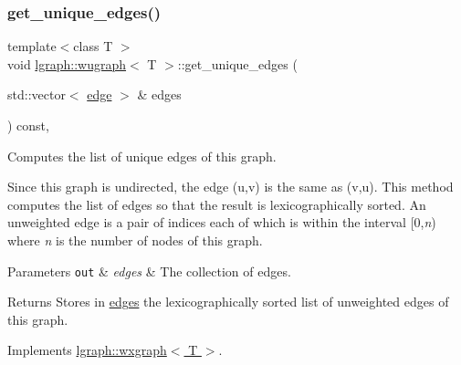 \subsubsection{\texorpdfstring{get\+\_\+unique\+\_\+edges()}{get\_unique\_edges()}\hspace{0.1cm}{\footnotesize\ttfamily [2/2]}}
{\footnotesize\ttfamily template$<$class T $>$ \\
void \hyperlink{classlgraph_1_1wugraph}{lgraph\+::wugraph}$<$ T $>$\+::get\+\_\+unique\+\_\+edges (\begin{DoxyParamCaption}\item[{std\+::vector$<$ \hyperlink{namespacelgraph_a76bd7d50719f03de7a85db259d80d572}{edge} $>$ \&}]{edges }\end{DoxyParamCaption}) const\hspace{0.3cm}{\ttfamily [protected]}, {\ttfamily [virtual]}}



Computes the list of unique edges of this graph. 

Since this graph is undirected, the edge (u,v) is the same as (v,u). This method computes the list of edges so that the result is lexicographically sorted. An unweighted edge is a pair of indices each of which is within the interval \mbox{[}0,{\itshape n}) where {\itshape n} is the number of nodes of this graph.


\begin{DoxyParams}[1]{Parameters}
\mbox{\tt out}  & {\em edges} & The collection of edges. \\
\hline
\end{DoxyParams}
\begin{DoxyReturn}{Returns}
Stores in \hyperlink{classlgraph_1_1wxgraph_a1b89f56544185e33d54e72a8ed19a789}{edges} the lexicographically sorted list of unweighted edges of this graph. 
\end{DoxyReturn}


Implements \hyperlink{classlgraph_1_1wxgraph_a6c1de8061b1606071320a01dd1b5fe64}{lgraph\+::wxgraph$<$ T $>$}.

\mbox{\label{classlgraph_1_1wxgraph_a468406b24e0d61a96b7106b845c5c718}} 
